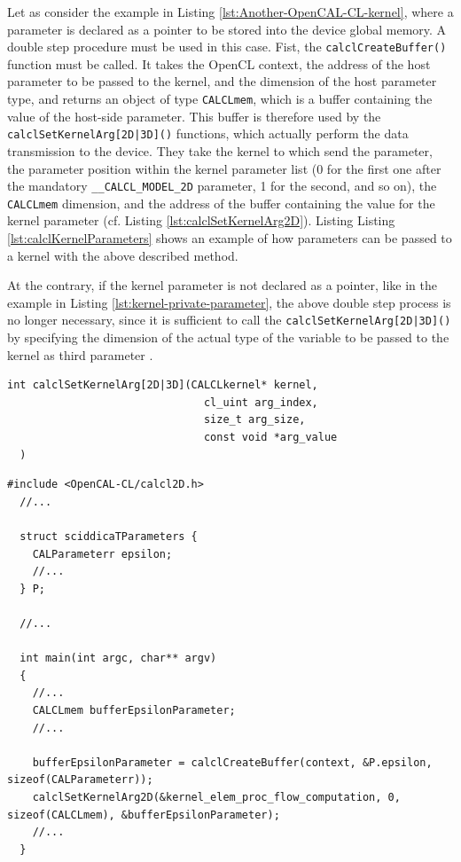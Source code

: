 Let as consider the example in Listing
\ref{lst:Another-OpenCAL-CL-kernel}, where a parameter is declared as
a pointer to be stored into the device global memory. A double step
procedure must be used in this case. Fist, the
\verb'calclCreateBuffer()' function must be called. It takes the
OpenCL context, the address of the host parameter to be passed to the
kernel, and the dimension of the host parameter type, and returns an
object of type \verb'CALCLmem', which is a buffer containing the value
of the host-side parameter. This buffer is therefore used by the
\verb'calclSetKernelArg[2D|3D]()' functions, which actually perform
the data transmission to the device. They take the kernel to which send
the parameter, the parameter position within the kernel parameter list
(0 for the first one after the mandatory \verb'__CALCL_MODEL_2D'
parameter, 1 for the second, and so on), the \verb'CALCLmem'
dimension, and the address of the buffer containing the value for the
kernel parameter (cf. Listing \ref{lst:calclSetKernelArg2D}). Listing
Listing \ref{lst:calclKernelParameters} shows an example of how
parameters can be passed to a kernel with the above described method.

At the contrary, if the kernel parameter is not declared as a pointer,
like in the example in Listing \ref{lst:kernel-private-parameter}, the
above double step process is no longer necessary, since it is
sufficient to call the \verb'calclSetKernelArg[2D|3D]()' by specifying
the dimension of the actual type of the variable to be passed to the
kernel as third parameter .


\begin{lstlisting}[float,floatplacement=H, label=lst:calclSetKernelArg2D, caption=The calclSetKernelArg2D() function., numbers=none]
  int calclSetKernelArg[2D|3D](CALCLkernel* kernel,
                               cl_uint arg_index,
                               size_t arg_size,
                               const void *arg_value
  )
\end{lstlisting}


\begin{lstlisting}[float,floatplacement=H, label=lst:calclKernelParameters, caption=Passing parametrs to kernel.]
  #include <OpenCAL-CL/calcl2D.h>
  //...

  struct sciddicaTParameters {
    CALParameterr epsilon;
    //...
  } P;

  //...

  int main(int argc, char** argv)
  {
    //...
    CALCLmem bufferEpsilonParameter;
    //...

    bufferEpsilonParameter = calclCreateBuffer(context, &P.epsilon, sizeof(CALParameterr));
    calclSetKernelArg2D(&kernel_elem_proc_flow_computation, 0, sizeof(CALCLmem), &bufferEpsilonParameter);
    //...
  }
\end{lstlisting}



